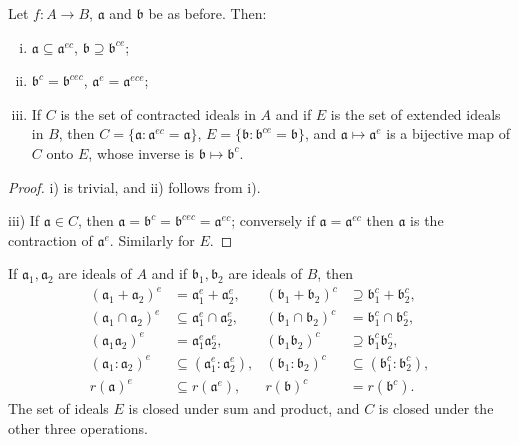 \begin{proposition}\label{prop:extension-contraction-properties}
Let $f \colon A \to B$, $\mathfrak{a}$ and $\mathfrak{b}$ be as before. Then:
\begin{enumerate}[i)]
    \item $\mathfrak{a} \subseteq \mathfrak{a}^{ec}$, $\mathfrak{b} \supseteq \mathfrak{b}^{ce}$;
    \item $\mathfrak{b}^c = \mathfrak{b}^{cec}$, $\mathfrak{a}^e = \mathfrak{a}^{ece}$;
    \item If $C$ is the set of contracted ideals in $A$ and if $E$ is the set of extended ideals in $B$, then $C = \{\mathfrak{a} : \mathfrak{a}^{ec} = \mathfrak{a}\}$, $E = \{\mathfrak{b} : \mathfrak{b}^{ce} = \mathfrak{b}\}$, and $\mathfrak{a} \mapsto \mathfrak{a}^e$ is a bijective map of $C$ onto $E$, whose inverse is $\mathfrak{b} \mapsto \mathfrak{b}^c$.
\end{enumerate}
\end{proposition}

\begin{proof}
i) is trivial, and ii) follows from i).

iii) If $\mathfrak{a} \in C$, then $\mathfrak{a} = \mathfrak{b}^c = \mathfrak{b}^{cec} = \mathfrak{a}^{ec}$; conversely if $\mathfrak{a} = \mathfrak{a}^{ec}$ then $\mathfrak{a}$ is the contraction of $\mathfrak{a}^e$. Similarly for $E$.
\end{proof}

\begin{exercise}\label{ex:extension-contraction-operations}
If $\mathfrak{a}_1, \mathfrak{a}_2$ are ideals of $A$ and if $\mathfrak{b}_1, \mathfrak{b}_2$ are ideals of $B$, then
\begin{align*}
    (\mathfrak{a}_1 + \mathfrak{a}_2)^e &= \mathfrak{a}_1^e + \mathfrak{a}_2^e, & (\mathfrak{b}_1 + \mathfrak{b}_2)^c &\supseteq \mathfrak{b}_1^c + \mathfrak{b}_2^c, \\
    (\mathfrak{a}_1 \cap \mathfrak{a}_2)^e &\subseteq \mathfrak{a}_1^e \cap \mathfrak{a}_2^e, & (\mathfrak{b}_1 \cap \mathfrak{b}_2)^c &= \mathfrak{b}_1^c \cap \mathfrak{b}_2^c, \\
    (\mathfrak{a}_1 \mathfrak{a}_2)^e &= \mathfrak{a}_1^e \mathfrak{a}_2^e, & (\mathfrak{b}_1 \mathfrak{b}_2)^c &\supseteq \mathfrak{b}_1^c \mathfrak{b}_2^c, \\
    (\mathfrak{a}_1 : \mathfrak{a}_2)^e &\subseteq (\mathfrak{a}_1^e : \mathfrak{a}_2^e), & (\mathfrak{b}_1 : \mathfrak{b}_2)^c &\subseteq (\mathfrak{b}_1^c : \mathfrak{b}_2^c), \\
    r(\mathfrak{a})^e &\subseteq r(\mathfrak{a}^e), & r(\mathfrak{b})^c &= r(\mathfrak{b}^c).
\end{align*}
The set of ideals $E$ is closed under sum and product, and $C$ is closed under the other three operations.
\end{exercise}


